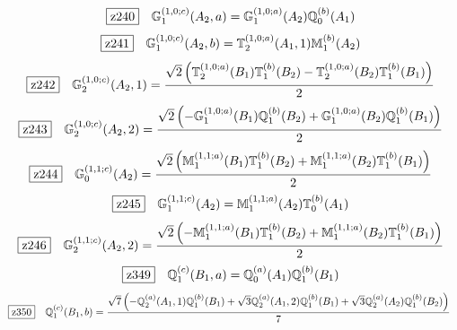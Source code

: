 \documentclass[fleqn,10pt,landscape]{jsarticle}
\begin{document}
\begin{dmath*}
\hspace*{3mm}\fbox{z240}\quad \mathbb{G}_{1}^{(1,0;c)}(A_{2},a)=\mathbb{G}_{1}^{(1,0;a)}(A_{2}) \mathbb{Q}_{0}^{(b)}(A_{1})
\end{dmath*}
\begin{dmath*}
\hspace*{3mm}\fbox{z241}\quad \mathbb{G}_{1}^{(1,0;c)}(A_{2},b)=\mathbb{T}_{2}^{(1,0;a)}(A_{1},1) \mathbb{M}_{1}^{(b)}(A_{2})
\end{dmath*}
\begin{dmath*}
\hspace*{3mm}\fbox{z242}\quad \mathbb{G}_{2}^{(1,0;c)}(A_{2},1)=\frac{\sqrt{2} \left(\mathbb{T}_{2}^{(1,0;a)}(B_{1}) \mathbb{T}_{1}^{(b)}(B_{2}) - \mathbb{T}_{2}^{(1,0;a)}(B_{2}) \mathbb{T}_{1}^{(b)}(B_{1})\right)}{2}
\end{dmath*}
\begin{dmath*}
\hspace*{3mm}\fbox{z243}\quad \mathbb{G}_{2}^{(1,0;c)}(A_{2},2)=\frac{\sqrt{2} \left(- \mathbb{G}_{1}^{(1,0;a)}(B_{1}) \mathbb{Q}_{1}^{(b)}(B_{2}) + \mathbb{G}_{1}^{(1,0;a)}(B_{2}) \mathbb{Q}_{1}^{(b)}(B_{1})\right)}{2}
\end{dmath*}
\begin{dmath*}
\hspace*{3mm}\fbox{z244}\quad \mathbb{G}_{0}^{(1,1;c)}(A_{2})=\frac{\sqrt{2} \left(\mathbb{M}_{1}^{(1,1;a)}(B_{1}) \mathbb{T}_{1}^{(b)}(B_{2}) + \mathbb{M}_{1}^{(1,1;a)}(B_{2}) \mathbb{T}_{1}^{(b)}(B_{1})\right)}{2}
\end{dmath*}
\begin{dmath*}
\hspace*{3mm}\fbox{z245}\quad \mathbb{G}_{1}^{(1,1;c)}(A_{2})=\mathbb{M}_{1}^{(1,1;a)}(A_{2}) \mathbb{T}_{0}^{(b)}(A_{1})
\end{dmath*}
\begin{dmath*}
\hspace*{3mm}\fbox{z246}\quad \mathbb{G}_{2}^{(1,1;c)}(A_{2},2)=\frac{\sqrt{2} \left(- \mathbb{M}_{1}^{(1,1;a)}(B_{1}) \mathbb{T}_{1}^{(b)}(B_{2}) + \mathbb{M}_{1}^{(1,1;a)}(B_{2}) \mathbb{T}_{1}^{(b)}(B_{1})\right)}{2}
\end{dmath*}
\begin{dmath*}
\hspace*{3mm}\fbox{z349}\quad \mathbb{Q}_{1}^{(c)}(B_{1},a)=\mathbb{Q}_{0}^{(a)}(A_{1}) \mathbb{Q}_{1}^{(b)}(B_{1})
\end{dmath*}
\begin{dmath*}
\hspace*{3mm}\fbox{z350}\quad \mathbb{Q}_{1}^{(c)}(B_{1},b)=\frac{\sqrt{7} \left(- \mathbb{Q}_{2}^{(a)}(A_{1},1) \mathbb{Q}_{1}^{(b)}(B_{1}) + \sqrt{3} \mathbb{Q}_{2}^{(a)}(A_{1},2) \mathbb{Q}_{1}^{(b)}(B_{1}) + \sqrt{3} \mathbb{Q}_{2}^{(a)}(A_{2}) \mathbb{Q}_{1}^{(b)}(B_{2})\right)}{7}
\end{dmath*}
\end{document}
